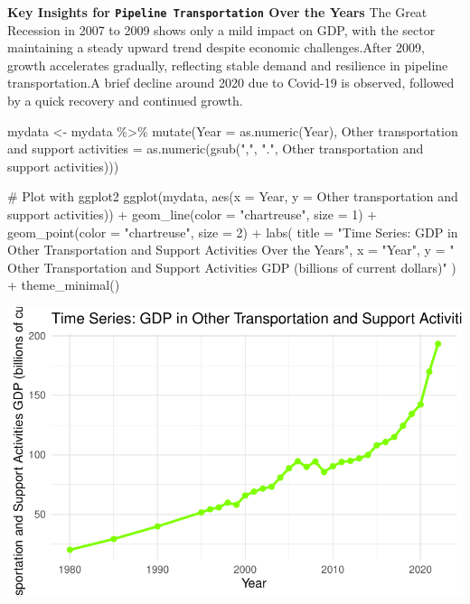 \documentclass[
  letterpaper,
  DIV=11,
  numbers=noendperiod]{scrreprt}
\newenvironment{Shaded}{\begin{snugshade}}{\end{snugshade}}
\newcommand{\AttributeTok}[1]{\textcolor[rgb]{0.40,0.45,0.13}{#1}}
\newcommand{\CommentTok}[1]{\textcolor[rgb]{0.37,0.37,0.37}{#1}}
\newcommand{\DecValTok}[1]{\textcolor[rgb]{0.68,0.00,0.00}{#1}}
\newcommand{\FunctionTok}[1]{\textcolor[rgb]{0.28,0.35,0.67}{#1}}
\newcommand{\NormalTok}[1]{\textcolor[rgb]{0.00,0.23,0.31}{#1}}
\newcommand{\OtherTok}[1]{\textcolor[rgb]{0.00,0.23,0.31}{#1}}
\newcommand{\SpecialCharTok}[1]{\textcolor[rgb]{0.37,0.37,0.37}{#1}}
\newcommand{\StringTok}[1]{\textcolor[rgb]{0.13,0.47,0.30}{#1}}
\begin{document}
\textbf{Key Insights for \texttt{Pipeline\ Transportation} Over the
Years} The Great Recession in 2007 to 2009 shows only a mild impact on
GDP, with the sector maintaining a steady upward trend despite economic
challenges.After 2009, growth accelerates gradually, reflecting stable
demand and resilience in pipeline transportation.A brief decline around
2020 due to Covid-19 is observed, followed by a quick recovery and
continued growth.

\begin{Shaded}
\begin{Highlighting}[]
\NormalTok{mydata }\OtherTok{\textless{}{-}}\NormalTok{ mydata }\SpecialCharTok{\%\textgreater{}\%}
  \FunctionTok{mutate}\NormalTok{(}\AttributeTok{Year =} \FunctionTok{as.numeric}\NormalTok{(Year),}
         \StringTok{\textasciigrave{}}\AttributeTok{Other transportation and support activities}\StringTok{\textasciigrave{}} \OtherTok{=} \FunctionTok{as.numeric}\NormalTok{(}\FunctionTok{gsub}\NormalTok{(}\StringTok{","}\NormalTok{, }\StringTok{"."}\NormalTok{, }\StringTok{\textasciigrave{}}\AttributeTok{Other transportation and support activities}\StringTok{\textasciigrave{}}\NormalTok{)))}

\CommentTok{\# Plot with ggplot2}
\FunctionTok{ggplot}\NormalTok{(mydata, }\FunctionTok{aes}\NormalTok{(}\AttributeTok{x =}\NormalTok{ Year, }\AttributeTok{y =} \StringTok{\textasciigrave{}}\AttributeTok{Other transportation and support activities}\StringTok{\textasciigrave{}}\NormalTok{)) }\SpecialCharTok{+}
  \FunctionTok{geom\_line}\NormalTok{(}\AttributeTok{color =} \StringTok{"chartreuse"}\NormalTok{, }\AttributeTok{size =} \DecValTok{1}\NormalTok{) }\SpecialCharTok{+}
  \FunctionTok{geom\_point}\NormalTok{(}\AttributeTok{color =} \StringTok{"chartreuse"}\NormalTok{, }\AttributeTok{size =} \DecValTok{2}\NormalTok{) }\SpecialCharTok{+}
  \FunctionTok{labs}\NormalTok{(}
    \AttributeTok{title =} \StringTok{"Time Series: GDP in Other Transportation and Support Activities Over the Years"}\NormalTok{,}
    \AttributeTok{x =} \StringTok{"Year"}\NormalTok{,}
    \AttributeTok{y =} \StringTok{" Other Transportation and Support Activities GDP (billions of current dollars)"}
\NormalTok{  ) }\SpecialCharTok{+}
  \FunctionTok{theme\_minimal}\NormalTok{()}
\end{Highlighting}
\end{Shaded}

\includegraphics{FinalProject_Abigail_files/figure-pdf/unnamed-chunk-8-1.pdf}
\end{document}
